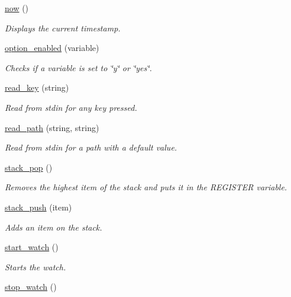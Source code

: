 \begin{DoxyCompactItemize}
\hyperlink{group__time_ga80593ccdc0339775ddd5d82c37ca4f6b}{now} ()
\begin{DoxyCompactList}\small\item\em Displays the current timestamp. \end{DoxyCompactList}\item 
\hyperlink{group__variable_ga6bdc53eb2a5563fa32ea4b342b665b70}{option\+\_\+enabled} (variable)
\begin{DoxyCompactList}\small\item\em Checks if a variable is set to \char`\"{}y\char`\"{} or \char`\"{}yes\char`\"{}. \end{DoxyCompactList}\item 
\hyperlink{group__stdin_ga13f97ec87f85badbce75a410d1ee9d03}{read\+\_\+key} (string)
\begin{DoxyCompactList}\small\item\em Read from stdin for any key pressed. \end{DoxyCompactList}\item 
\hyperlink{group__stdin_ga48cdd2c9387240df93e79364425097f3}{read\+\_\+path} (string, string)
\begin{DoxyCompactList}\small\item\em Read from stdin for a path with a default value. \end{DoxyCompactList}\item 
\hyperlink{group__stack_gafcec48f7160b75a50d6a5ff973915768}{stack\+\_\+pop} ()
\begin{DoxyCompactList}\small\item\em Removes the highest item of the stack and puts it in the \textquotesingle{}R\+E\+G\+I\+S\+T\+ER\textquotesingle{} variable. \end{DoxyCompactList}\item 
\hyperlink{group__stack_ga6b8010e6e027472c4e17b4d8bdfbb9f2}{stack\+\_\+push} (item)
\begin{DoxyCompactList}\small\item\em Adds an item on the stack. \end{DoxyCompactList}\item 
\hyperlink{group__time_ga7e2fbddbf76933cd70d29512c2f12519}{start\+\_\+watch} ()
\begin{DoxyCompactList}\small\item\em Starts the watch. \end{DoxyCompactList}\item 
\hyperlink{group__time_gabdbb7601d766420b7be1703457c91aa7}{stop\+\_\+watch} ()

\end{DoxyCompactItemize}
